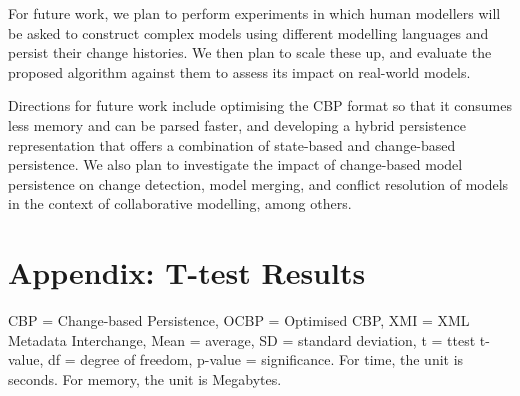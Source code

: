 \documentclass{llncs}
\begin{document}
For future work, we plan to perform experiments in which human modellers will be asked to construct complex models using different modelling languages and persist their change histories. We then plan to scale these up, and evaluate the proposed algorithm against them to assess its impact on real-world models.

Directions for future work include optimising the CBP format so that it consumes less memory and can be parsed faster, and developing a hybrid persistence representation that offers a combination of state-based and change-based persistence. We also plan to investigate the impact of change-based model persistence on change detection, model merging, and conflict resolution of models in the context of collaborative modelling, among others.

 


\section*{Appendix: T-test Results}
\label{app:t_test_results}
CBP = Change-based Persistence, OCBP = Optimised CBP, XMI = XML Metadata Interchange, Mean = average, SD = standard deviation, t = ttest t-value, df = degree of freedom, p-value = significance. For time, the unit is seconds. For memory, the unit is Megabytes.
\end{document}

